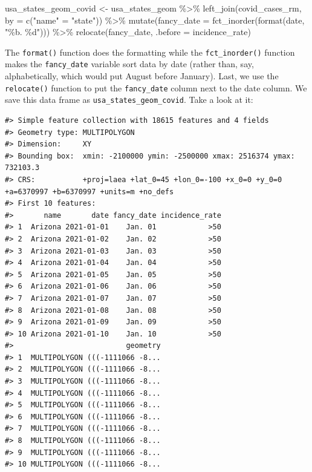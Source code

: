 \documentclass[
]{book}
\newenvironment{Shaded}{\begin{snugshade}}{\end{snugshade}}
\newcommand{\AttributeTok}[1]{\textcolor[rgb]{0.77,0.63,0.00}{#1}}
\newcommand{\FunctionTok}[1]{\textcolor[rgb]{0.00,0.00,0.00}{#1}}
\newcommand{\NormalTok}[1]{#1}
\newcommand{\OtherTok}[1]{\textcolor[rgb]{0.56,0.35,0.01}{#1}}
\newcommand{\SpecialCharTok}[1]{\textcolor[rgb]{0.00,0.00,0.00}{#1}}
\newcommand{\StringTok}[1]{\textcolor[rgb]{0.31,0.60,0.02}{#1}}
\begin{document}
\begin{Shaded}
\begin{Highlighting}[]
\NormalTok{usa\_states\_geom\_covid }\OtherTok{\textless{}{-}}\NormalTok{ usa\_states\_geom }\SpecialCharTok{\%\textgreater{}\%}
  \FunctionTok{left\_join}\NormalTok{(covid\_cases\_rm, }\AttributeTok{by =} \FunctionTok{c}\NormalTok{(}\StringTok{"name"} \OtherTok{=} \StringTok{"state"}\NormalTok{)) }\SpecialCharTok{\%\textgreater{}\%}
  \FunctionTok{mutate}\NormalTok{(}\AttributeTok{fancy\_date =} \FunctionTok{fct\_inorder}\NormalTok{(}\FunctionTok{format}\NormalTok{(date, }\StringTok{"\%b. \%d"}\NormalTok{))) }\SpecialCharTok{\%\textgreater{}\%} 
  \FunctionTok{relocate}\NormalTok{(fancy\_date, }\AttributeTok{.before =}\NormalTok{ incidence\_rate)}
\end{Highlighting}
\end{Shaded}

The \texttt{format()} function does the formatting while the \texttt{fct\_inorder()} function makes the \texttt{fancy\_date} variable sort data by date (rather than, say, alphabetically, which would put August before January). Last, we use the \texttt{relocate()} function to put the \texttt{fancy\_date} column next to the date column. We save this data frame as \texttt{usa\_states\_geom\_covid}. Take a look at it:

\begin{verbatim}
#> Simple feature collection with 18615 features and 4 fields
#> Geometry type: MULTIPOLYGON
#> Dimension:     XY
#> Bounding box:  xmin: -2100000 ymin: -2500000 xmax: 2516374 ymax: 732103.3
#> CRS:           +proj=laea +lat_0=45 +lon_0=-100 +x_0=0 +y_0=0 +a=6370997 +b=6370997 +units=m +no_defs
#> First 10 features:
#>       name       date fancy_date incidence_rate
#> 1  Arizona 2021-01-01    Jan. 01            >50
#> 2  Arizona 2021-01-02    Jan. 02            >50
#> 3  Arizona 2021-01-03    Jan. 03            >50
#> 4  Arizona 2021-01-04    Jan. 04            >50
#> 5  Arizona 2021-01-05    Jan. 05            >50
#> 6  Arizona 2021-01-06    Jan. 06            >50
#> 7  Arizona 2021-01-07    Jan. 07            >50
#> 8  Arizona 2021-01-08    Jan. 08            >50
#> 9  Arizona 2021-01-09    Jan. 09            >50
#> 10 Arizona 2021-01-10    Jan. 10            >50
#>                          geometry
#> 1  MULTIPOLYGON (((-1111066 -8...
#> 2  MULTIPOLYGON (((-1111066 -8...
#> 3  MULTIPOLYGON (((-1111066 -8...
#> 4  MULTIPOLYGON (((-1111066 -8...
#> 5  MULTIPOLYGON (((-1111066 -8...
#> 6  MULTIPOLYGON (((-1111066 -8...
#> 7  MULTIPOLYGON (((-1111066 -8...
#> 8  MULTIPOLYGON (((-1111066 -8...
#> 9  MULTIPOLYGON (((-1111066 -8...
#> 10 MULTIPOLYGON (((-1111066 -8...
\end{verbatim}
\end{document}
